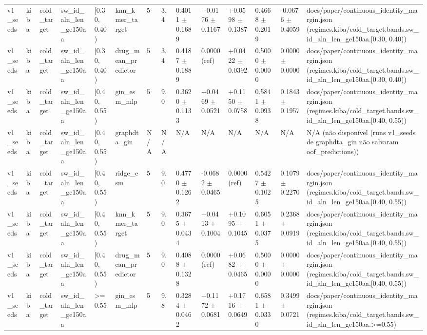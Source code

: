 \begin{table}[htbp]
\begin{tabular}{llllllllllllll}
v1\_seeds & kiba & cold\_target & sw\_id\_aln\_len\_ge150aa & [0.30, 0.40) & knn\_kmer\_target & 5 & 3.4 & 0.4011 $\pm$ 0.1689 & +0.0176 $\pm$ 0.1167 & +0.0598 $\pm$ 0.1387 & 0.4668 $\pm$ 0.2019 & -0.0676 $\pm$ 0.4059 & docs/paper/continuous\_identity\_margin.json (regimes.kiba/cold\_target.bands.sw\_id\_aln\_len\_ge150aa.[0.30, 0.40)) \\
v1\_seeds & kiba & cold\_target & sw\_id\_aln\_len\_ge150aa & [0.30, 0.40) & drug\_mean\_predictor & 5 & 3.4 & 0.4187 $\pm$ 0.1889 & 0.0000 (ref) & +0.0422 $\pm$ 0.0392 & 0.5000 $\pm$ 0.0000 & 0.0000 $\pm$ 0.0000 & docs/paper/continuous\_identity\_margin.json (regimes.kiba/cold\_target.bands.sw\_id\_aln\_len\_ge150aa.[0.30, 0.40)) \\
v1\_seeds & kiba & cold\_target & sw\_id\_aln\_len\_ge150aa & [0.40, 0.55) & gin\_esm\_mlp & 5 & 9.0 & 0.3620 $\pm$ 0.1133 & +0.0469 $\pm$ 0.0521 & +0.1150 $\pm$ 0.0758 & 0.5841 $\pm$ 0.0938 & 0.1843 $\pm$ 0.1957 & docs/paper/continuous\_identity\_margin.json (regimes.kiba/cold\_target.bands.sw\_id\_aln\_len\_ge150aa.[0.40, 0.55)) \\
v1\_seeds & kiba & cold\_target & sw\_id\_aln\_len\_ge150aa & [0.40, 0.55) & graphdta\_gin & N/A & N/A & N/A & N/A & N/A & N/A & N/A & N/A (não disponível (runs v1\_seeds de graphdta\_gin não salvaram oof\_predictions)) \\
v1\_seeds & kiba & cold\_target & sw\_id\_aln\_len\_ge150aa & [0.40, 0.55) & ridge\_esm & 5 & 9.0 & 0.4770 $\pm$ 0.1262 & -0.0682 $\pm$ 0.0465 & 0.0000 (ref) & 0.5427 $\pm$ 0.1025 & 0.1079 $\pm$ 0.2270 & docs/paper/continuous\_identity\_margin.json (regimes.kiba/cold\_target.bands.sw\_id\_aln\_len\_ge150aa.[0.40, 0.55)) \\
v1\_seeds & kiba & cold\_target & sw\_id\_aln\_len\_ge150aa & [0.40, 0.55) & knn\_kmer\_target & 5 & 9.0 & 0.3675 $\pm$ 0.0434 & +0.0413 $\pm$ 0.1004 & +0.1095 $\pm$ 0.1045 & 0.6051 $\pm$ 0.0375 & 0.2368 $\pm$ 0.0919 & docs/paper/continuous\_identity\_margin.json (regimes.kiba/cold\_target.bands.sw\_id\_aln\_len\_ge150aa.[0.40, 0.55)) \\
v1\_seeds & kiba & cold\_target & sw\_id\_aln\_len\_ge150aa & [0.40, 0.55) & drug\_mean\_predictor & 5 & 9.0 & 0.4088 $\pm$ 0.1328 & 0.0000 (ref) & +0.0682 $\pm$ 0.0465 & 0.5000 $\pm$ 0.0000 & 0.0000 $\pm$ 0.0000 & docs/paper/continuous\_identity\_margin.json (regimes.kiba/cold\_target.bands.sw\_id\_aln\_len\_ge150aa.[0.40, 0.55)) \\
v1\_seeds & kiba & cold\_target & sw\_id\_aln\_len\_ge150aa & >=0.55 & gin\_esm\_mlp & 5 & 9.8 & 0.3284 $\pm$ 0.0462 & +0.1172 $\pm$ 0.0681 & +0.1716 $\pm$ 0.0649 & 0.6581 $\pm$ 0.0330 & 0.3499 $\pm$ 0.0721 & docs/paper/continuous\_identity\_margin.json (regimes.kiba/cold\_target.bands.sw\_id\_aln\_len\_ge150aa.>=0.55) \\

\end{tabular}
\end{table}

